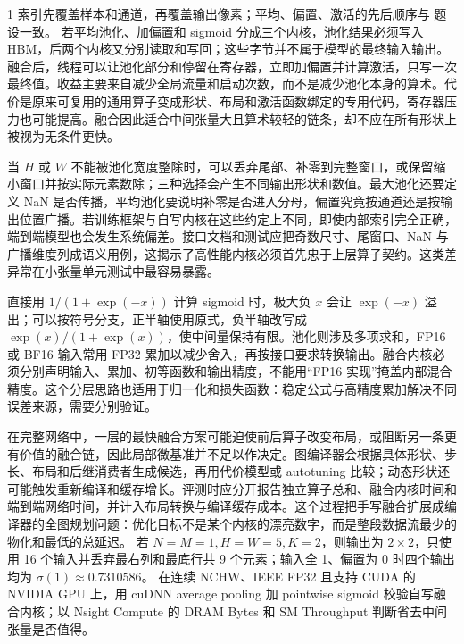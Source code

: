 \begin{solutionexercise}{1}
\conclusionheading 索引先覆盖样本和通道，再覆盖输出像素；平均、偏置、激活的先后顺序与
题设一致。
\discussionheading
{}
若平均池化、加偏置和 sigmoid 分成三个内核，池化结果必须写入 HBM，后两个内核又分别读取和写回；这些字节并不属于模型的最终输入输出。融合后，线程可以让池化部分和停留在寄存器，立即加偏置并计算激活，只写一次最终值。收益主要来自减少全局流量和启动次数，而不是减少池化本身的算术。代价是原来可复用的通用算子变成形状、布局和激活函数绑定的专用代码，寄存器压力也可能提高。融合因此适合中间张量大且算术较轻的链条，却不应在所有形状上被视为无条件更快。

当 $H$ 或 $W$ 不能被池化宽度整除时，可以丢弃尾部、补零到完整窗口，或保留缩小窗口并按实际元素数除；三种选择会产生不同输出形状和数值。最大池化还要定义 NaN 是否传播，平均池化要说明补零是否进入分母，偏置究竟按通道还是按输出位置广播。若训练框架与自写内核在这些约定上不同，即使内部索引完全正确，端到端模型也会发生系统偏差。接口文档和测试应把奇数尺寸、尾窗口、NaN 与广播维度列成语义用例，这揭示了高性能内核必须首先忠于上层算子契约。这类差异常在小张量单元测试中最容易暴露。

直接用 $1/(1+\exp(-x))$ 计算 sigmoid 时，极大负 $x$ 会让 $\exp(-x)$ 溢出；可以按符号分支，正半轴使用原式，负半轴改写成 $\exp(x)/(1+\exp(x))$，使中间量保持有限。池化则涉及多项求和，FP16 或 BF16 输入常用 FP32 累加以减少舍入，再按接口要求转换输出。融合内核必须分别声明输入、累加、初等函数和输出精度，不能用“FP16 实现”掩盖内部混合精度。这个分层思路也适用于归一化和损失函数：稳定公式与高精度累加解决不同误差来源，需要分别验证。

在完整网络中，一层的最快融合方案可能迫使前后算子改变布局，或阻断另一条更有价值的融合链，因此局部微基准并不足以作决定。图编译器会根据具体形状、步长、布局和后继消费者生成候选，再用代价模型或 autotuning 比较；动态形状还可能触发重新编译和缓存增长。评测时应分开报告独立算子总和、融合内核时间和端到端网络时间，并计入布局转换与编译缓存成本。这个过程把手写融合扩展成编译器的全图规划问题：优化目标不是某个内核的漂亮数字，而是整段数据流最少的物化和最低的总延迟。
\variantheading 若 $N=M=1,H=W=5,K=2$，则输出为 $2\times2$，只使用 16 个输入并丢弃最右列和最底行共 9 个元素；输入全 1、偏置为 0 时四个输出均为 $\sigma(1)\approx0.7310586$。
\practiceheading 在连续 NCHW、IEEE FP32 且支持 CUDA 的 NVIDIA GPU 上，用 cuDNN average pooling 加 pointwise sigmoid 校验自写融合内核；以 Nsight Compute 的 DRAM Bytes 和 SM Throughput 判断省去中间张量是否值得。
\end{solutionexercise}

